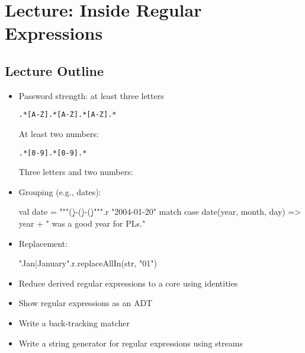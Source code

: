 \chapter{Lecture: Inside Regular Expressions}
\startlecture

\begin{instructor}

\section*{Lecture Outline}

\begin{itemize}

\item Password strength: at least three letters

\begin{verbatim}
.*[A-Z].*[A-Z].*[A-Z].*
\end{verbatim}

At least two numbers:

\begin{verbatim}
.*[0-9].*[0-9].*
\end{verbatim}

Three letters and two numbers:

\item Grouping (e.g., dates):

\begin{scalacode}
    val date = """(\d\d\d\d)-(\d\d)-(\d\d)""".r
    "2004-01-20" match {
      case date(year, month, day) => year + " was a good year for PLs."
    }
\end{scalacode}

\item Replacement:

\begin{scalacode}
"Jan|January".r.replaceAllIn(str, "01")
\end{scalacode}

\item Reduce derived regular expressions to a core using identities

\item Show regular expressions as an ADT

\item Write a back-tracking matcher

\item Write a string generator for regular expressions using streams

\end{itemize}

\end{instructor}

